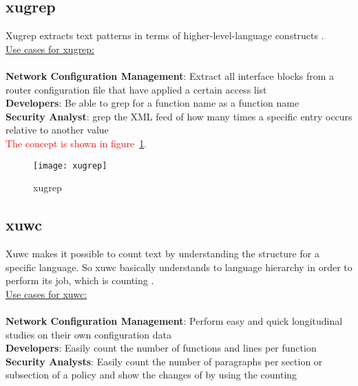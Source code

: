 \subsection{xugrep}

Xugrep extracts text patterns in terms of higher-level-language constructs \cite{xutools01}.\\

\underline{Use cases for xugrep:} \\ \\

\textbf{Network Configuration Management}: Extract all interface blocks from a router configuration file that have applied a certain access list\\
\textbf{Developers}: Be able to grep for a function name as a function name\\
\textbf{Security Analyst}: grep the XML feed of how many times a specific entry occurs relative to another value\\

\textcolor{red}{The concept is shown in figure~\ref{fig:xugrep}.}\\

\begin{center}
        \begin{figure}[h!]
          \centering
                \texttt{[image: xugrep]}
          \caption{xugrep}
          \label{fig:xugrep}
        \end{figure}
\end{center}
\newpage

\subsection{xuwc}

Xuwc makes it possible to count text by understanding the structure for a specific language. So xuwc basically understands to language hierarchy in order to perform its job, which is counting \cite{xutools01}. \\

\underline{Use cases for xuwc:} \\ \\

\textbf{Network Configuration Management}: Perform easy and quick longitudinal studies on their own configuration data\\
\textbf{Developers}: Easily count the number of functions and lines per function\\
\textbf{Security Analysts}: Easily count the number of paragraphs per section or subsection of a policy and show the changes of by using the counting\\

